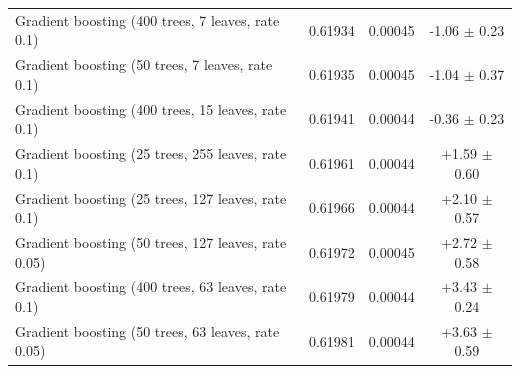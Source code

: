 \begin{table}[h]
\begin{tabular}{lccc}
Gradient boosting (400 trees, 7 leaves, rate 0.1) & 0.61934 & 0.00045 & -1.06 $\pm$ 0.23 \\
Gradient boosting (50 trees, 7 leaves, rate 0.1) & 0.61935 & 0.00045 & -1.04 $\pm$ 0.37 \\
Gradient boosting (400 trees, 15 leaves, rate 0.1) & 0.61941 & 0.00044 & -0.36 $\pm$ 0.23 \\
Gradient boosting (25 trees, 255 leaves, rate 0.1) & 0.61961 & 0.00044 & +1.59 $\pm$ 0.60 \\
Gradient boosting (25 trees, 127 leaves, rate 0.1) & 0.61966 & 0.00044 & +2.10 $\pm$ 0.57 \\
Gradient boosting (50 trees, 127 leaves, rate 0.05) & 0.61972 & 0.00045 & +2.72 $\pm$ 0.58 \\
Gradient boosting (400 trees, 63 leaves, rate 0.1) & 0.61979 & 0.00044 & +3.43 $\pm$ 0.24 \\
Gradient boosting (50 trees, 63 leaves, rate 0.05) & 0.61981 & 0.00044 & +3.63 $\pm$ 0.59 \\
\bottomrule
\end{tabular}
\end{table}
